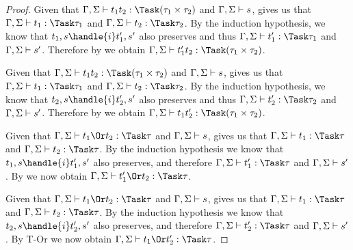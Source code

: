 \begin{proof}
     {Given that $\Gamma,\Sigma\infers t_1\And t_2:\Task(\tau_1\times\tau_2)$ and $\Gamma,\Sigma\vdash s$,  gives us that $\Gamma,\Sigma\infers t_1:\Task\tau_1$ and $\Gamma,\Sigma\infers t_2:\Task\tau_2$.
     By the induction hypothesis, we know that $t_1,s\handle{i}t_1',s'$ also preserves and thus $\Gamma,\Sigma\infers t_1':\Task\tau_1$ and $\Gamma,\Sigma\vdash s'$.
     Therefore by  we obtain $\Gamma,\Sigma\infers t_1'\And t_2:\Task(\tau_1\times\tau_2)$.}

     {Given that $\Gamma,\Sigma\infers t_1\And t_2:\Task(\tau_1\times\tau_2)$ and $\Gamma,\Sigma\vdash s$,  gives us that $\Gamma,\Sigma\infers t_1:\Task\tau_1$ and $\Gamma,\Sigma\infers t_2:\Task\tau_2$.
     By the induction hypothesis, we know that $t_2,s\handle{i}t_2',s'$ also preserves and thus $\Gamma,\Sigma\infers t_2':\Task\tau_2$ and $\Gamma,\Sigma\vdash s'$.
     Therefore by  we obtain $\Gamma,\Sigma\infers t_1\And t_2':\Task(\tau_1\times\tau_2)$.}

     {Given that $\Gamma,\Sigma\infers t_1\Or t_2:\Task\tau$ and $\Gamma,\Sigma\vdash s$,  gives us that $\Gamma,\Sigma\infers t_1:\Task\tau$ and $\Gamma,\Sigma\infers t_2:\Task\tau$.
     By the induction hypothesis we know that $t_1,s\handle{i}t_1',s'$ also preserves, and therefore $\Gamma,\Sigma\infers t_1':\Task\tau$ and $\Gamma,\Sigma\vdash s'$.
     By  we now obtain $\Gamma,\Sigma\infers t_1'\Or t_2:\Task\tau$.}

     {Given that $\Gamma,\Sigma\infers t_1\Or t_2:\Task\tau$ and $\Gamma,\Sigma\vdash s$,  gives us that $\Gamma,\Sigma\infers t_1:\Task\tau$ and $\Gamma,\Sigma\infers t_2:\Task\tau$.
     By the induction hypothesis we know that $t_2,s\handle{i}t_2',s'$ also preserves, and therefore $\Gamma,\Sigma\infers t_2':\Task\tau$ and $\Gamma,\Sigma\vdash s'$.
     By T-Or we now obtain $\Gamma,\Sigma\infers t_1\Or t_2':\Task\tau$.}

\end{proof}

